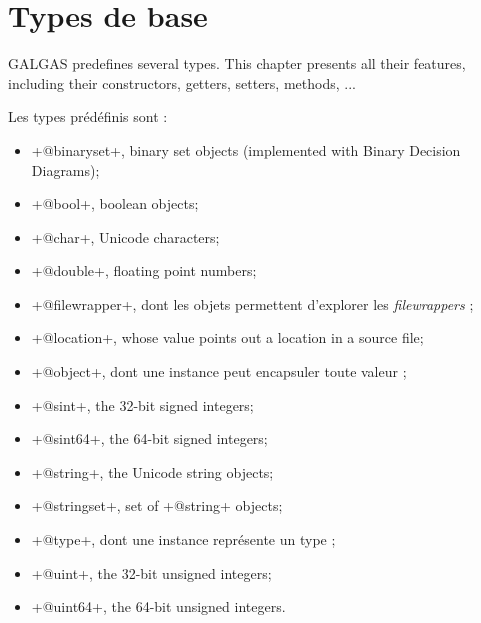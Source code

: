 
\chapter{Types de base}\label{predefinedTypes}

GALGAS predefines several types. This chapter presents all their features, including their constructors, getters, setters, methods, ...


Les types prédéfinis sont :
\begin{itemize}
\item \ggs+@binaryset+, binary set objects (implemented with Binary Decision Diagrams);
\item \ggs+@bool+, boolean objects;
\item \ggs+@char+, Unicode characters;
\item \ggs+@double+, floating point numbers;
\item \ggs+@filewrapper+, dont les objets permettent d'explorer les \emph{filewrappers} ;
\item \ggs+@location+, whose value points out a location in a source file;
\item \ggs+@object+, dont une instance peut encapsuler toute valeur ;
\item \ggs+@sint+, the 32-bit signed integers;
\item \ggs+@sint64+, the 64-bit signed integers;
\item \ggs+@string+, the Unicode string objects;
\item \ggs+@stringset+, set of \ggs+@string+ objects;
\item \ggs+@type+, dont une instance représente un type ;
\item \ggs+@uint+, the 32-bit unsigned integers;
\item \ggs+@uint64+, the 64-bit unsigned integers.
\end{itemize}

